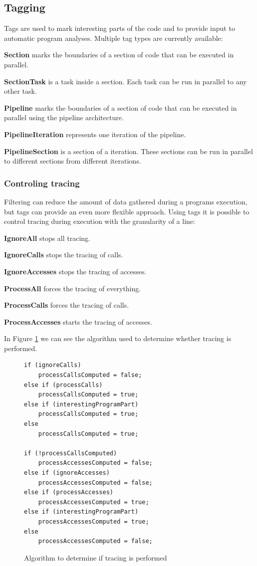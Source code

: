 \subsection{Tagging}

Tags are used to mark interesting parts of the code and to provide input to automatic program analyses. Multiple tag types are currently available:

\textbf{Section} marks the boundaries of a section of code that can be executed in parallel.

\textbf{SectionTask} is a task inside a section. Each task can be run in parallel to any other task.

\textbf{Pipeline} marks the boundaries of a section of code that can be executed in parallel using the pipeline architecture.

\textbf{PipelineIteration} represents one iteration of the pipeline.

\textbf{PipelineSection} is a section of a iteration. These sections can be run in parallel to different sections from different iterations.

\subsubsection{Controling tracing}
\label{controllingtracing}

Filtering can reduce the amount of data gathered during a programs execution, but tags can provide an even more flexible approach. Using tags it is possible to control tracing during execution with the granularity of a line:

\textbf{IgnoreAll} stops all tracing.

\textbf{IgnoreCalls} stops the tracing of calls.

\textbf{IgnoreAccesses} stops the tracing of accesses.

\textbf{ProcessAll} forces the tracing of everything.

\textbf{ProcessCalls} forces the tracing of calls.

\textbf{ProcessAccesses} starts the tracing of accesses.

In Figure \ref{cap3:contralg} we can see the algorithm used to determine whether tracing is performed.

\begin{figure}
	\begin{center}
		\begin{verbatim}
if (ignoreCalls)
	processCallsComputed = false;
else if (processCalls)
	processCallsComputed = true;
else if (interestingProgramPart)
	processCallsComputed = true;
else
	processCallsComputed = true;

if (!processCallsComputed)
	processAccessesComputed = false;
else if (ignoreAccesses)
	processAccessesComputed = false;
else if (processAccesses)
	processAccessesComputed = true;
else if (interestingProgramPart)
	processAccessesComputed = true;
else
	processAccessesComputed = false;
		\end{verbatim}
	\end{center}
	\caption{Algorithm to determine if tracing is performed}
	\label{cap3:contralg}
\end{figure}

